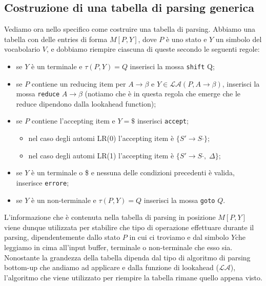 \documentclass[class=book, crop=false, oneside, 12pt]{standalone}
\begin{document}
\subsection{Costruzione di una tabella di parsing generica}
Vediamo ora nello specifico come costruire una tabella di parsing. Abbiamo una tabella con delle entries di forma \(M[P, Y]\), dove \(P\) è uno stato e \(Y\) un simbolo del vocabolario \(V\), e dobbiamo riempire ciascuna di queste secondo le seguenti regole:
\begin{itemize}
    \item se \(Y\) è un terminale e \(\tau (P,Y) = Q\) inserisci la mossa \texttt{shift} Q;
    \item se \(P\) contiene un reducing item per \(A \to \beta\) e \(Y \in \mathcal{LA}(P, A \to \beta)\), inserisci la mossa \texttt{reduce} \(A \to \beta\) (notiamo che è in questa regola che emerge che le reduce dipendono dalla lookahead function);
    \item se \(P\) contiene l'accepting item e \(Y=\$\) inserisci \texttt{accept};
        \begin{itemize}
            \item nel caso degli automi LR(0) l'accepting item è \(\{S' \to S \cdot\}\);
            \item nel caso degli automi LR(1) l'accepting item è \(\{S' \to S \cdot, \; \Delta\}\);
        \end{itemize}
\item se \(Y\) è un terminale o \$ e nessuna delle condizioni precedenti è valida, inserisce \texttt{errore};
    \item se \(Y\) è un non-terminale e \(\tau (P, Y) = Q\) inserisci la mossa \texttt{goto} \(Q\).
\end{itemize}
L'informazione che è contenuta nella tabella di parsing in posizione \(M[P, Y]\) viene dunque utilizzata per stabilire che tipo di operazione effettuare durante il parsing, dipendentemente dallo stato \(P\) in cui ci troviamo e dal simbolo \(Y\)che leggiamo in cima all'input buffer, terminale o non-terminale che esso sia. Nonostante la grandezza della tabella dipenda dal tipo di algoritmo di parsing bottom-up che andiamo ad applicare e dalla funzione di lookahead (\(\mathcal{LA}\)), l'algoritmo che viene utilizzato per riempire la tabella rimane quello appena visto.
\end{document}
